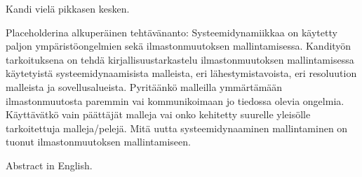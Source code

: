 \documentclass[finnish,12pt,a4paper,pdftex]{article}
\begin{document}


\makecoverpage


\begin{abstractpage}[finnish]
Kandi vielä pikkasen kesken. 

Placeholderina alkuperäinen tehtävänanto: Systeemidynamiikkaa on käytetty paljon ympäristöongelmien sekä ilmastonmuutoksen mallintamisessa. Kandityön tarkoituksena on tehdä kirjallisuustarkastelu ilmastonmuutoksen mallintamisessa käytetyistä systeemidynaamisista malleista, eri lähestymistavoista, eri resoluution malleista ja sovellusalueista. Pyritäänkö malleilla ymmärtämään ilmastonmuutosta paremmin vai kommunikoimaan jo tiedossa olevia ongelmia. Käyttävätkö vain päättäjät malleja vai onko kehitetty suurelle yleisölle tarkoitettuja malleja/pelejä. Mitä uutta systeemidynaaminen mallintaminen on tuonut ilmastonmuutoksen mallintamiseen.
\end{abstractpage}

\newpage
%
\begin{abstractpage}[english]
 Abstract in English. 
\end{abstractpage}
\end{document}
